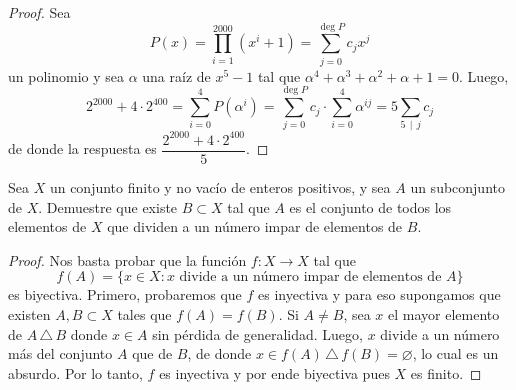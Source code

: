 \begin{proof}
	Sea
	\[P(x)=\prod_{i=1}^{2000}(x^i+1)=\sum_{j=0}^{\deg P}c_jx^j\]
	un polinomio y sea $\alpha$ una raíz de $x^5-1$ tal que $\alpha^4+\alpha^3+\alpha^2+\alpha+1=0$. Luego,
	\[2^{2000}+4\cdot 2^{400}=\sum_{i=0}^4 P(\alpha^i)=\sum_{j=0}^{\deg P}c_j\cdot\sum_{i=0}^4\alpha^{ij}=5\sum_{5\,\mid\,j}c_j\]
	de donde la respuesta es $\dfrac{2^{2000}+4\cdot 2^{400}}{5}$.
\end{proof}

\begin{probEG}
	Sea $X$ un conjunto finito y no vacío de enteros positivos, y sea $A$ un subconjunto de $X$. Demuestre que existe $B\subset X$ tal que $A$ es el conjunto de todos los elementos de $X$ que dividen a un número impar de elementos de $B$.
\end{probEG}

\begin{proof}
	Nos basta probar que la función $f:X\to X$ tal que
	\[f(A)=\{x\in X:x\text{ divide a un número impar de elementos de }A\}\]
	es biyectiva. Primero, probaremos que $f$ es inyectiva y para eso supongamos que existen $A,B\subset X$ tales que $f(A)=f(B)$. Si $A\ne B$, sea $x$ el mayor elemento de $A\,\triangle\,B$ donde $x\in A$ sin pérdida de generalidad. Luego, $x$ divide a un número más del conjunto $A$ que de $B$, de donde $x\in f(A)\,\triangle\,f(B)=\varnothing$, lo cual es un absurdo. Por lo tanto, $f$ es inyectiva y por ende biyectiva pues $X$ es finito.
\end{proof}
